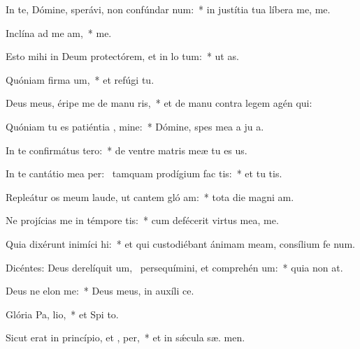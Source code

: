 \item In te, Dómine, sperávi, non confúndar  num:~* in justítia tua líbera me,   me.
\item Inclína ad me  am,~*   me.
\item Esto mihi in Deum protectórem, et in lo tum:~* ut   as.
\item Quóniam firma um,~* et refúgi   tu.
\item Deus meus, éripe me de manu ris,~* et de manu contra legem agén  qui:
\item Quóniam tu es patiéntia , mine:~* Dómine, spes mea a ju a.
\item In te confirmátus   tero:~* de ventre matris meæ tu es  us.
\item In te cantátio mea per:~\pscross{} tamquam prodígium fac  tis:~* et tu  tis.
\item Repleátur os meum laude, ut cantem gló am:~* tota die magni am.
\item Ne projícias me in témpore tis:~* cum defécerit virtus mea,   me.
\item Quia dixérunt inimíci  hi:~* et qui custodiébant ánimam meam, consílium fe  num.
\item Dicéntes: Deus derelíquit um,~\pscross{} persequímini, et comprehén um:~* quia non   at.
\item Deus ne elon  me:~* Deus meus, in auxíli  ce.
\item Glória Pa,  lio,~* et Spi to.
\item Sicut erat in princípio, et ,  per,~* et in sǽcula sæ. men.
